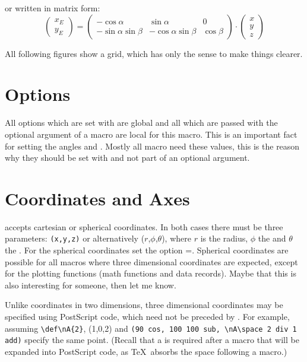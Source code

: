 \documentclass[11pt,english,BCOR10mm,DIV12,bibliography=totoc,parskip=false,smallheadings
    headexclude,footexclude,oneside,dvipsnames,svgnames]{pst-doc}
\begin{document}
\noindent or written in matrix form:
{\footnotesize\addtolength{\arraycolsep}{-2pt}
\begin{equation}
\begin{pmatrix}x_E\\y_E\end{pmatrix}=
  \begin{pmatrix}
    -\cos\alpha & \sin\alpha & 0\\
    -\sin\alpha\sin\beta & -\cos\alpha\sin\beta & \cos\beta
  \end{pmatrix}\cdot
\begin{pmatrix}x\\y\\z\end{pmatrix}
\end{equation}%
\addtolength{\arraycolsep}{2pt}%
}

All following figures show a grid, which has only the sense to make things clearer.

\section{Options}
All options which are set with  are global and all which are passed with the optional 
argument of a macro are local for this macro. This is an important fact for setting the angles 
 and . Mostly all macro need these values, this is the reason why they 
should be set with  and not part of an optional argument.


\section{Coordinates and Axes}
 accepts cartesian or spherical coordinates. In both cases there
must be three parameters: \verb+(x,y,z)+ or alternatively ($r$,$\phi$,$\theta$),
where $r$ is the radius, $\phi$ the  and $\theta$ the .
For the spherical coordinates set the option =\true. Spherical coordinates
are possible for all macros where three dimensional coordinates are expected, except
for the plotting functions (math functions and data records). Maybe that this is also interesting
for someone, then let me know.

Unlike coordinates in two dimensions, three dimensional coordinates  
may be specified using PostScript code, which need not be preceded by  
\Lnotation{!}. For example, assuming \verb+\def\nA{2}+, (1,0,2) and 
\verb+(90 cos, 100 100 sub, \nA\space 2 div 1 add)+ specify the same point.  
(Recall that a  is required after a macro that will be  
expanded into PostScript code, as \TeX\ absorbs the space following a  
macro.)
\end{document}
